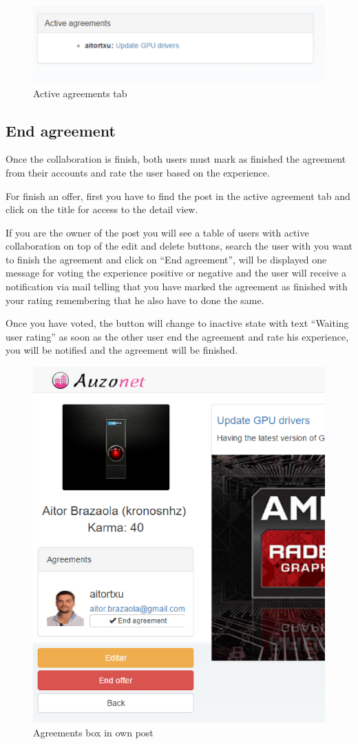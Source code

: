 \documentclass{DeustoFDP}
\begin{document}
\begin{figure}[h!]
\centering
\includegraphics[width=0.9\linewidth]{fig/Manual/activeagreements}
\caption[Active agreements tab]{Active agreements tab}
\label{fig:activeagreements}
\end{figure}

\newpage
\subsection{End agreement}
Once the collaboration is finish, both users must mark as finished the agreement from their accounts and rate the user based on the experience.

For finish an offer, first you have to find the post in the active agreement tab and click on the title for access to the detail view.

If you are the owner of the post you will see a table of users with active collaboration on top of the edit and delete buttons, search the user with you want to finish the agreement and click on “End agreement”, will be displayed one message for voting the experience positive or negative and the user will receive a notification via mail telling that you have marked the agreement as finished with your rating remembering that he also have to done the same.

Once you have voted, the button will change to inactive state with text “Waiting user rating” as soon as the other user end the agreement and rate his experience, you will be notified and the agreement will be finished.

\begin{figure}[h!]
\centering
\includegraphics[width=0.7\linewidth]{fig/Manual/endagreementsowner}
\caption[Agreements box in own post]{Agreements box in own post}
\label{fig:endagreementsowner}
\end{figure}
\end{document}
